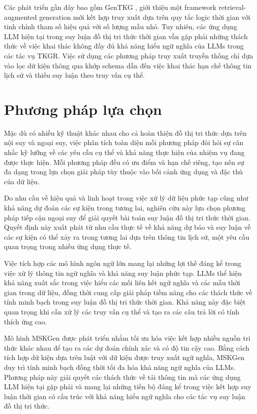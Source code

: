 Các phát triển gần đây bao gồm GenTKG \cite{ref_article10}, giới thiệu một framework retrieval-augmented generation mới kết hợp truy xuất dựa trên quy tắc logic thời gian với tinh chỉnh tham số hiệu quả với số lượng mẫu nhỏ. Tuy nhiên, các ứng dụng LLM hiện tại trong suy luận đồ thị tri thức thời gian vẫn gặp phải những thách thức về việc khai thác không đầy đủ khả năng hiểu ngữ nghĩa của LLMs trong các tác vụ TKGR. Việc sử dụng các phương pháp truy xuất truyền thống chỉ dựa vào lọc dữ kiện thông qua khớp schema dẫn đến việc khai thác hạn chế thông tin lịch sử và thiếu suy luận theo truy vấn cụ thể.


\section{Phương pháp lựa chọn}

Mặc dù có nhiều kỹ thuật khác nhau cho cả hoàn thiện đồ thị tri thức dựa trên nội suy và ngoại suy, việc phân tích toàn diện mỗi phương pháp đòi hỏi sự cân nhắc kỹ lưỡng về các yêu cầu cụ thể và khả năng thực hiện của nhiệm vụ đang được thực hiện. Mỗi phương pháp đều có ưu điểm và hạn chế riêng, tạo nên sự đa dạng trong lựa chọn giải pháp tùy thuộc vào bối cảnh ứng dụng và đặc thù của dữ liệu.

Do nhu cầu về hiệu quả và linh hoạt trong việc xử lý dữ liệu phức tạp cũng như khả năng dự đoán các sự kiện trong tương lai, nghiên cứu này lựa chọn phương pháp tiếp cận ngoại suy để giải quyết bài toán suy luận đồ thị tri thức thời gian. Quyết định này xuất phát từ nhu cầu thực tế về khả năng dự báo và suy luận về các sự kiện có thể xảy ra trong tương lai dựa trên thông tin lịch sử, một yêu cầu quan trọng trong nhiều ứng dụng thực tế.

Việc tích hợp các mô hình ngôn ngữ lớn mang lại những lợi thế đáng kể trong việc xử lý thông tin ngữ nghĩa và khả năng suy luận phức tạp. LLMs thể hiện khả năng xuất sắc trong việc hiểu các mối liên kết ngữ nghĩa và các mẫu thời gian trong dữ liệu, đồng thời cung cấp giải pháp tiềm năng cho các thách thức về tính minh bạch trong suy luận đồ thị tri thức thời gian. Khả năng này đặc biệt quan trọng khi cần xử lý các truy vấn cụ thể và tạo ra các câu trả lời có tính thích ứng cao.

Mô hình MSKGen được phát triển nhằm tối ưu hóa việc kết hợp nhiều nguồn tri thức khác nhau để tạo ra các dự đoán chính xác và có độ tin cậy cao. Bằng cách tích hợp dữ kiện dựa trên luật với dữ kiện được truy xuất ngữ nghĩa, MSKGen duy trì tính minh bạch đồng thời tối đa hóa khả năng ngữ nghĩa của LLMs. Phương pháp này giải quyết các thách thức về tải thông tin mà các ứng dụng LLM hiện tại gặp phải và mang lại những tiến bộ đáng kể trong việc kết hợp suy luận thời gian có cấu trúc với khả năng hiểu ngữ nghĩa cho các tác vụ suy luận đồ thị tri thức.